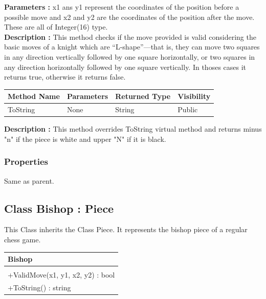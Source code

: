 \documentclass[12pt]{article}
\begin{document}
\textbf{Parameters :} x1 ans y1 represent the coordinates of the position before a possible move
and x2 and y2 are the coordinates of the position after the move. These are all of Integer(16) type.
\\
\textbf{Description :} This method checks if the move provided is valid considering the basic moves of a knight which
are “L-shape”—that is, they can move two squares in any direction
vertically followed by one square horizontally, or two squares in any
direction horizontally followed by one square vertically. In thoses 
cases it returns true, otherwise it returns false. 

\begin{table}[H]
    \begin{tabular}{|l|l|l|l|}
    \hline
    \rowcolor[HTML]{EFEFEF} 
    \cellcolor[HTML]{EFEFEF}\textbf{Method Name} & \textbf{Parameters}  & \textbf{Returned Type} & \textbf{Visibility} \\ \hline
    ToString                                   & None                 & String                   & Public              \\ \hline
    \end{tabular}
\end{table}

\textbf{Description :} This method overrides ToString virtual
method and returns minus "n" if the piece is white and upper "N"
if it is black.

\subsubsection{Properties}

Same as parent.

\newpage


\subsection{Class Bishop : Piece}

This Class inherits the Class Piece. It represents the bishop 
piece of a regular chess game.
\begin{table}[H]
    \begin{tabular}{|l|}
    \hline
    \cellcolor[HTML]{C0C0C0}\textbf{Bishop} \\ \hline
    \cellcolor[HTML]{EFEFEF}                    \\ \hline
    +ValidMove(x1, y1, x2, y2) : bool           \\ \hline
    +ToString() : string                        \\ \hline
    \end{tabular}
\end{table}
\end{document}
